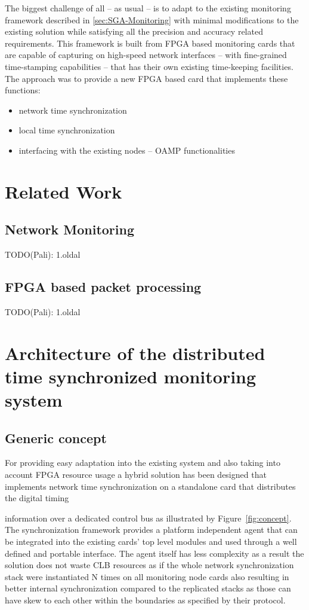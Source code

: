\documentclass[journal]{IEEEtran}
\begin{document}
The biggest challenge of all -- as usual -- is to adapt to the existing monitoring framework described in
\ref{sec:SGA-Monitoring}
with minimal modifications to the existing solution while satisfying all the precision and accuracy related
requirements.
This framework is built from FPGA based monitoring cards that are capable of capturing on high-speed network interfaces
--
with fine-grained time-stamping capabilities -- that has their own existing time-keeping facilities.
The approach was to provide a new FPGA based card that implements these functions:
\begin{itemize}
    \item network time synchronization
    \item local time synchronization
    \item interfacing with the existing nodes -- OAMP functionalities
\end{itemize}

\section{Related Work}

\subsection{Network Monitoring}
TODO(Pali): 1.oldal

\subsection{FPGA based packet processing}
TODO(Pali): 1.oldal

\IEEEpubidadjcol

\section{Architecture of the distributed time synchronized monitoring system}

\subsection{Generic concept}
For providing easy adaptation into the existing system and also taking into account FPGA resource usage a hybrid
solution
has been designed that implements network time synchronization on a standalone card that distributes the digital timing

information over a dedicated control bus as illustrated by Figure~\ref{fig:concept}.
The synchronization framework provides a platform independent agent that
can be integrated into the existing cards' top level modules and used through a well defined and portable interface.
The agent itself has less complexity as a result the solution does not waste CLB resources as if the whole network
synchronization stack were instantiated N times on all monitoring node cards also resulting in better internal
synchronization
compared to the replicated stacks as those can have skew to each other within the boundaries as specified by their
protocol.
\end{document}
